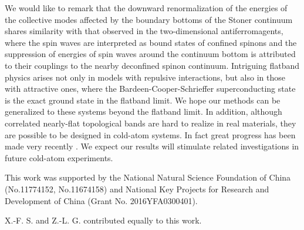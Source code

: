 \documentclass[amsmath,superscriptaddress,showpacs,aps,prb,twocolumn]{revtex4-1}
\begin{document}
\par We would like to remark that the downward renormalization of the energies of the collective modes affected by the boundary bottoms of the Stoner continuum shares similarity with that observed in the two-dimensional antiferromagents, where the spin waves are interpreted as bound states of confined spinons and the suppression of energies of spin waves around the continuum bottom is attributed to their couplings to the nearby deconfined spinon continuum\cite{ZFSMC_PRL2006,TS_PRL2013,DMCNTPEMIR_NP2015,SQCCMS_PRX2017,YWDYL_PRB2018}. Intriguing flatband physics arises not only in models with repulsive interactions, but also in those with attractive ones\cite{PT_NC2015,JPVKT_PRL2016,LVPSHT_PRB2017,TLP_arXiv2018}, where the Bardeen-Cooper-Schrieffer superconducting state is the exact ground state in the flatband limit\cite{PT_NC2015,JPVKT_PRL2016}. We hope our methods can be generalized to these systems beyond the flatband limit. In addition, although correlated nearly-flat topological bands are hard to realize in real materials, they are possible to be designed in cold-atom systems. In fact great progress has been made very recently \cite{LCJPS_N2009,AALBPB_PRL2013,MSKBK_PRL2013,JMDLUGE_N2014}. We expect our results will stimulate related investigations in future cold-atom experiments.

\begin{acknowledgments}
\par This work was supported by the National Natural Science Foundation of China (No.11774152, No.11674158) and National Key Projects for Research and Development of China (Grant No. 2016YFA0300401).
\par X.-F. S. and Z.-L. G. contributed equally to this work.
\end{acknowledgments}


\end{document}

